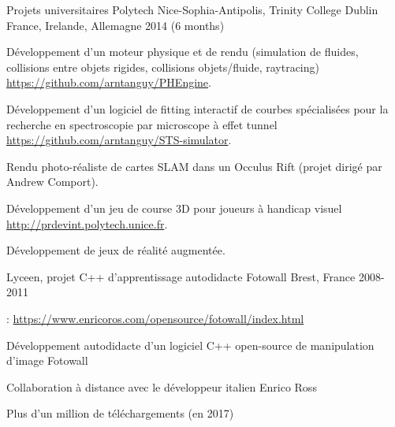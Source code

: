 \begin{cventries}
  \cventry
    {Projets universitaires} %
    {Polytech Nice-Sophia-Antipolis, Trinity College Dublin} %
    {France, Irelande, Allemagne} %
    {2014 (6 months)} %
    {
      \begin{cvitems} %
        \item Développement d'un moteur physique et de rendu (simulation de fluides, collisions entre objets rigides, collisions objets/fluide, raytracing)\\\url{https://github.com/arntanguy/PHEngine}.
        \item Développement d'un logiciel de fitting interactif de courbes spécialisées pour la recherche en spectroscopie par microscope à effet tunnel\\\url{https://github.com/arntanguy/STS-simulator}. 
        \item Rendu photo-réaliste de cartes SLAM dans un Occulus Rift (projet dirigé par Andrew Comport).
        \item Développement d'un jeu de course 3D pour joueurs à handicap visuel\\\url{http://prdevint.polytech.unice.fr}. 
        \item Développement de jeux de réalité augmentée.
      \end{cvitems}
    }

  \cventry
    {Lyceen, projet C++ d'apprentissage autodidacte} %
    {Fotowall} %
    {Brest, France} %
    {2008-2011} %
    {
      \begin{cvitems} %
        \item {}: \url{https://www.enricoros.com/opensource/fotowall/index.html}
        \item Développement autodidacte d'un logiciel C++ open-source de manipulation d'image Fotowall
        \item Collaboration à distance avec le développeur italien Enrico Ross
        \item Plus d'un million de téléchargements (en 2017)
      \end{cvitems}
    }

\end{cventries}

